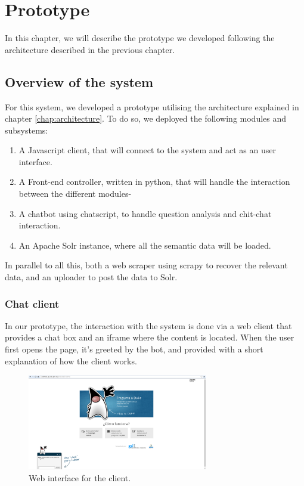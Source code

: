 \chapter{Prototype}
\label{chap:prototype}

\begin{chapterintro}

In this chapter, we will describe the prototype we developed following the architecture described in the previous chapter.
 
\end{chapterintro}

\cleardoublepage

\section{Overview of the system}

For this system, we developed a prototype utilising the architecture explained in chapter \ref{chap:architecture}. To do so, we deployed the following modules and subsystems:

\begin{enumerate}
 \item A Javascript client, that will connect to the system and act as an user interface.
 \item A Front-end controller, written in python, that will handle the interaction between the different modules-
 \item A chatbot using chatscript, to handle question analysis and chit-chat interaction.
 \item An Apache Solr instance, where all the semantic data will be loaded.
\end{enumerate}

In parallel to all this, both a web scraper using scrapy to recover the relevant data, and an uploader to post the data to Solr.

\subsection{Chat client}
\label{sec:chatclient}

In our prototype, the interaction with the system is done via a web client that provides a chat box and an iframe where the content is located. When the user first opens the page, it's greeted by the bot, and provided with a   short explanation of how the client works.

\begin{figure}[!htbp]
    \centering
    \includegraphics[width=0.7\textwidth]{img/screens/ask-client.png}
    \caption{Web interface for the client.}
    \label{fig:chat1}
\end{figure}

